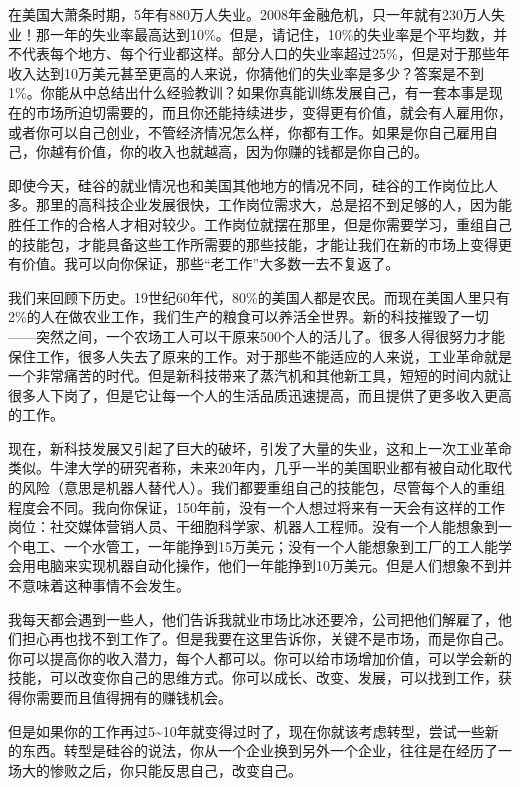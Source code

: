 在美国大萧条时期，5年有880万人失业。2008年金融危机，只一年就有230万人失业！那一年的失业率最高达到10\%。但是，请记住，10\%的失业率是个平均数，并不代表每个地方、每个行业都这样。部分人口的失业率超过25\%，但是对于那些年收入达到10万美元甚至更高的人来说，你猜他们的失业率是多少？答案是不到1\%。你能从中总结出什么经验教训？如果你真能训练发展自己，有一套本事是现在的市场所迫切需要的，而且你还能持续进步，变得更有价值，就会有人雇用你，或者你可以自己创业，不管经济情况怎么样，你都有工作。如果是你自己雇用自己，你越有价值，你的收入也就越高，因为你赚的钱都是你自己的。

即使今天，硅谷的就业情况也和美国其他地方的情况不同，硅谷的工作岗位比人多。那里的高科技企业发展很快，工作岗位需求大，总是招不到足够的人，因为能胜任工作的合格人才相对较少。工作岗位就摆在那里，但是你需要学习，重组自己的技能包，才能具备这些工作所需要的那些技能，才能让我们在新的市场上变得更有价值。我可以向你保证，那些“老工作”大多数一去不复返了。

我们来回顾下历史。19世纪60年代，80\%的美国人都是农民。而现在美国人里只有2\%的人在做农业工作，我们生产的粮食可以养活全世界。新的科技摧毁了一切——突然之间，一个农场工人可以干原来500个人的活儿了。很多人得很努力才能保住工作，很多人失去了原来的工作。对于那些不能适应的人来说，工业革命就是一个非常痛苦的时代。但是新科技带来了蒸汽机和其他新工具，短短的时间内就让很多人下岗了，但是它让每一个人的生活品质迅速提高，而且提供了更多收入更高的工作。

现在，新科技发展又引起了巨大的破坏，引发了大量的失业，这和上一次工业革命类似。牛津大学的研究者称，未来20年内，几乎一半的美国职业都有被自动化取代的风险（意思是机器人替代人）。我们都要重组自己的技能包，尽管每个人的重组程度会不同。我向你保证，150年前，没有一个人想过将来有一天会有这样的工作岗位：社交媒体营销人员、干细胞科学家、机器人工程师。没有一个人能想象到一个电工、一个水管工，一年能挣到15万美元；没有一个人能想象到工厂的工人能学会用电脑来实现机器自动化操作，他们一年能挣到10万美元。但是人们想象不到并不意味着这种事情不会发生。

我每天都会遇到一些人，他们告诉我就业市场比冰还要冷，公司把他们解雇了，他们担心再也找不到工作了。但是我要在这里告诉你，关键不是市场，而是你自己。你可以提高你的收入潜力，每个人都可以。你可以给市场增加价值，可以学会新的技能，可以改变你自己的思维方式。你可以成长、改变、发展，可以找到工作，获得你需要而且值得拥有的赚钱机会。

但是如果你的工作再过5\textasciitilde{}10年就变得过时了，现在你就该考虑转型，尝试一些新的东西。转型是硅谷的说法，你从一个企业换到另外一个企业，往往是在经历了一场大的惨败之后，你只能反思自己，改变自己。

